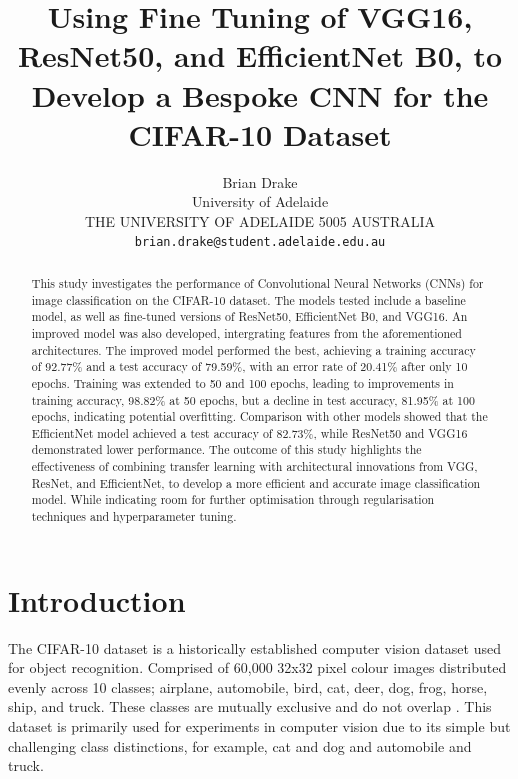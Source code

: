 \documentclass[10pt,twocolumn,letterpaper]{article}
\begin{document}
\title{Using Fine Tuning of VGG16, ResNet50, and EfficientNet B0, to Develop a Bespoke CNN for the CIFAR-10 Dataset}

\author{Brian Drake\\
University of Adelaide\\
THE UNIVERSITY OF ADELAIDE
5005 AUSTRALIA\\
{\tt\small brian.drake@student.adelaide.edu.au}
}
\maketitle

\begin{abstract}
This study investigates the performance of Convolutional Neural Networks (CNNs) for image classification on the CIFAR-10 dataset. The models tested include a baseline model, as well as fine-tuned versions of ResNet50, EfficientNet B0, and VGG16. An improved model was also developed, intergrating features from the aforementioned architectures. The improved model performed the best, achieving a training accuracy of 92.77\% and a test accuracy of 79.59\%, with an error rate of 20.41\% after only 10 epochs. Training was extended to 50 and 100 epochs, leading to improvements in training accuracy, 98.82\% at 50 epochs, but a decline in test accuracy, 81.95\% at 100 epochs, indicating potential overfitting. Comparison with other models showed that the EfficientNet model achieved a test accuracy of 82.73\%, while ResNet50 and VGG16 demonstrated lower performance. The outcome of this study highlights the effectiveness of combining transfer learning with architectural innovations from VGG, ResNet, and EfficientNet, to develop a more efficient and accurate image classification model. While indicating room for further optimisation through regularisation techniques and hyperparameter tuning.
\end{abstract}

\section{Introduction}
\label{sec:intro}
The CIFAR-10 dataset is a historically established computer vision dataset used for object recognition. Comprised of 60,000 32x32 pixel colour images distributed evenly across 10 classes; airplane, automobile, bird, cat, deer, dog, frog, horse, ship, and truck. These classes are mutually exclusive and do not overlap \cite{cifar10}. This dataset is primarily used for experiments in computer vision due to its simple but challenging class distinctions, for example, cat and dog and automobile and truck.
\end{document}
